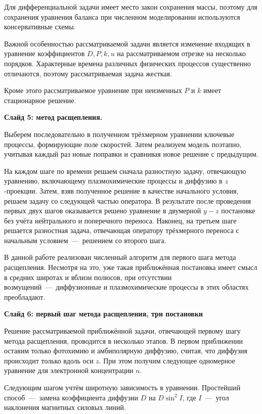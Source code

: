 \documentclass[2pt, a4paper, fleqn]{extarticle}
\begin{document}
Для дифференциальной задачи имеет место закон сохранения массы, поэтому для сохранения уравнения баланса при численном моделировании используются консервативные схемы.

Важной особенностью рассматриваемой задачи является изменение входящих в уравнение коэффициентов $D, P, k, u$ на рассматриваемом отрезке на несколько порядков. 
Характерные времена различных физических процессов существенно отличаются, поэтому рассматриваемая задача жесткая.

Кроме этого рассматриваемое уравнение при неизменных $P$ и $k$ имеет стационарное решение.

\medskip

{\bf Слайд 5: метод расщепления.}


Выберем последовательно в полученном трёхмерном уравнении ключевые процессы, формирующие поле скоростей. Затем реализуем модель поэтапно, учитывая каждый раз новые поправки и сравнивая новое решение с предыдущим.

На каждом шаге по времени решаем сначала разностную задачу, отвечающую уравнению, включающему плазмохимические процессы и диффузию в $z$-проекции. Затем, взяв полученное решение в качестве начального условия, решаем задачу со следующей частью оператора. В результате после проведения первых двух шагов оказывается решено уравнение в двумерной $y-z$ постановке без учёта нейтрального и поперечного переноса. Наконец, на третьем шаге решается разностная задача, отвечающая оператору трёхмерного переноса с начальным условием~---~решением со второго шага. 

В данной работе реализован численный алгоритм для первого шага метода расщепления. Несмотря на это, уже такая приближённая постановка имеет смысл в средних широтах и вблизи полюсов, при отсутствии возмущений~---~диффузионные и плазмохимические процессы в этих областях преобладают.



\medskip

{\bf Слайд 6: первый шаг метода расщепления, три постановки}

Решение рассматриваемой приближённой задачи, отвечающей первому шагу метода расщепления, проводится в несколько этапов. В первом приближении оставим только фотохимию и амбиполярную диффузию, считая, что диффузия происходит только вдоль оси $z$. При этом получим следующее одномерное уравнение для электронной концентрации $n$.

Следующим шагом учтём широтную зависимость в уравнении. Простейший способ~---~замена коэффициента диффузии $D$ на $D\sin^2I$, где $I$~---~угол наклонения магнитных силовых линий.
\end{document}
